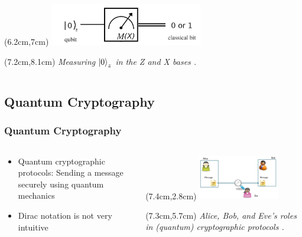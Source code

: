 \documentclass[]{beamer}
\begin{document}
\begin{frame}
\begin{columns}
\begin{column}{0.5\textwidth}
\begin{center}
\begin{textblock*}{7cm}
				\end{textblock*}
				\begin{textblock*}{7cm}(6.2cm,7cm)
				\includegraphics[width=0.5\textwidth]{MeasureInX.png}
				\end{textblock*}
				\begin{textblock*}{5cm}(7.2cm,8.1cm)
				\tiny	\textit{Measuring $\ket{0}_z$ in the Z and X bases \cite{Mishra2019}.}
				\end{textblock*}
			\end{center}
		\end{column}
	\end{columns}
\end{frame}

\subsection{Quantum Cryptography}

\begin{frame}
	\frametitle{Quantum Cryptography}
	\begin{columns}
		\begin{column}{0.6\textwidth}
				\begin{itemize}
				\item Quantum cryptographic protocols: Sending a message securely using quantum mechanics
				\vspace{2cm}
				\item Dirac notation is not very intuitive
				\end{itemize}
		\end{column}
	\begin{column}{0.5\textwidth}
		\begin{textblock*}{10cm}(7.4cm,2.8cm)
			\includegraphics[width=0.5\textwidth]{AliceEveBob.png}
		\end{textblock*}
	\begin{textblock*}{6cm}(7.3cm,5.7cm)
		\tiny	\textit{Alice, Bob, and Eve's roles in (quantum) cryptographic protocols \cite{Cunche2011}.}
	\end{textblock*}
	\end{column}
	\end{columns}
\end{frame}
\end{document}

